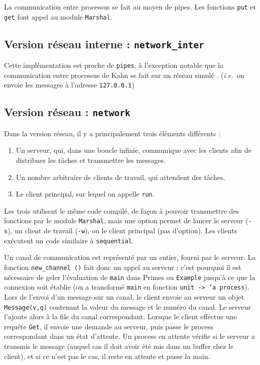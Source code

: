 \documentclass[11pt,a4paper]{article}
\newcommand{\ie}{\textit{i.e.}}
\renewcommand{\tt}[1]{\texttt{#1}}
\begin{document}
La communication entre processus se fait au moyen de pipes. Les fonctions
\tt{put} et \tt{get} font appel au module \tt{Marshal}. 

\subsection{Version réseau interne : \tt{network\_inter}}

Cette implémentation est proche de \tt{pipes}, à l'exception notable que
la communication entre processus de Kahn se fait sur un réseau \og simulé \fg{}.
(\ie ~on envoie les messages à l'adresse \tt{127.0.0.1})

\subsection{Version réseau : \texttt{network}}

Dans la version réseau, il y a principalement trois éléments différents :
\begin{enumerate}
\item Un serveur, qui, dans une boucle infinie, communique avec les clients afin de
distribuer les tâches et transmettre les messages.
\item Un nombre arbitraire de clients de travail, qui attendent des tâches.
\item Le client principal, sur lequel on appelle \tt{run}.
\end{enumerate}

Les trois utilisent le même code compilé, de façon à pouvoir transmettre des
fonctions par le module \tt{Marshal}, mais une option permet de lancer le serveur
(\tt{-s}), un client de travail (\tt{-w}), ou le client principal (pas d'option).
Les clients exécutent un code similaire à \tt{sequential}.

Un canal de communication est représenté par un entier, fourni par le serveur.
La fonction \tt{new\_channel ()} fait donc un appel au serveur ; c'est pourquoi il
est nécessaire de geler l'évaluation de \tt{main} dans Primes ou \tt{Example} jusqu'à ce
que la connexion soit établie (on a transformé \tt{main} en fonction \tt{unit -> 'a process}).
Lors de l'envoi d'un message sur un canal, le client envoie
au serveur un objet \tt{Message(v,q)} contenant la valeur du message et le numéro du
canal. Le serveur l'ajoute alors à la file du canal correspondant. Lorsque le
client effectue une requête \tt{Get}, il envoie une demande au serveur, puis passe
le process correspondant dans un état d'attente. Un process en attente vérifie
si le serveur a transmis le message (auquel cas il doit avoir été mis dans un
buffer chez le client), et si ce n'est pas le cas, il reste en attente et
passe la main.
\end{document}
